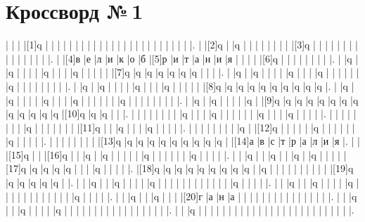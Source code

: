 \documentclass[final, pdftex, 12pt]{../../template/epsilonj}
\begin{document}
\section*{Кроссворд №\,1}
\PuzzleUnitlength=16pt
\begin{Puzzle}{28}{20}%
|{}  |{}  |{}  |[1]q   |{}  |{}  |{}  |{}  |{}  |{}  |{}  |{}  |{}  |{}  |{}  |{}  |{}  |{}  |{}  |{}  |{}  |{}  |{}  |{}  |{}  |{}  |{}  |{}  |.
|{}  |[2]q   |{}  |q   |{}  |{}  |{}  |{}  |{}  |{}  |{}  |{}  |[3]q   |{}  |{}  |{}  |{}  |{}  |{}  |{}  |{}  |{}  |{}  |{}  |{}  |{}  |{}  |{}  |.
|{}  |[4]{в} |{е} |{л} |{и} |{к} |{о} |{б} |[5]{р} |{и} |{т} |{а} |{н} |{и} |{я} |{}  |{}  |{}  |{}  |[6]q   |{}  |{}  |{}  |{}  |{}  |{}  |{}  |{}  |.
|{}  |q   |{}  |q   |{}  |{}  |{}  |{}  |q   |{}  |{}  |{}  |q   |{}  |{}  |{}  |{}  |{}  |[7]q   |q   |q   |q   |q   |q   |q   |{}  |{}  |{}  |.
|{}  |q   |{}  |q   |{}  |{}  |{}  |{}  |q   |{}  |{}  |{}  |q   |{}  |{}  |{}  |{}  |{}  |{}  |q   |{}  |{}  |{}  |{}  |{}  |{}  |{}  |{}  |.
|{}  |q   |{}  |q   |{}  |{}  |{}  |{}  |q   |{}  |{}  |{}  |q   |{}  |{}  |{}  |{}  |{}  |[8]q   |q   |q   |q   |q   |q   |q   |q   |q   |q   |.
|{}  |q   |{}  |q   |{}  |{}  |{}  |{}  |q   |{}  |{}  |{}  |q   |{}  |{}  |{}  |{}  |{}  |{}  |q   |{}  |{}  |{}  |{}  |{}  |{}  |{}  |{}  |.
|{}  |q   |{}  |q   |{}  |{}  |{}  |{}  |q   |{}  |[9]q   |q   |q   |q   |q   |q   |q   |q   |q   |q   |q   |q   |q   |[10]q   |q   |q   |{}  |{}  |.
|{}  |{}  |{}  |{}  |{}  |{}  |{}  |{}  |q   |{}  |{}  |{}  |q   |{}  |{}  |{}  |{}  |{}  |{}  |q   |{}  |{}  |{}  |q   |{}  |{}  |{}  |{}  |.
|{}  |{}  |{}  |{}  |{}  |{}  |{}  |{}  |q   |{}  |{}  |{}  |{}  |{}  |{}  |{}  |[11]q   |{}  |{}  |q   |{}  |{}  |{}  |q   |{}  |{}  |{}  |{}  |.
|{}  |{}  |{}  |{}  |{}  |{}  |{}  |{}  |q   |{}  |[12]q   |{}  |{}  |{}  |{}  |{}  |q   |{}  |{}  |{}  |{}  |{}  |{}  |q   |{}  |{}  |{}  |{}  |.
|{}  |{}  |{}  |{}  |{}  |{}  |{}  |{}  |[13]q   |q   |q   |q   |q   |q   |q   |q   |q   |q   |{}  |[14]{а} |{в} |{с} |{т} |{р} |{а} |{л} |{и} |{я} |.
|{}  |{}  |[15]q   |{}  |{}  |[16]q   |{}  |{}  |q   |{}  |q   |{}  |{}  |{}  |{}  |{}  |q   |{}  |{}  |{}  |{}  |{}  |{}  |q   |{}  |{}  |{}  |{}  |.
|{}  |{}  |q   |{}  |{}  |q   |{}  |{}  |q   |{}  |q   |{}  |{}  |{}  |{}  |[17]q   |q   |q   |q   |q   |{}  |{}  |{}  |q   |{}  |{}  |{}  |{}  |.
|[18]q   |q   |q   |q   |q   |q   |q   |q   |q   |{}  |q   |{}  |{}  |{}  |{}  |{}  |{}  |{}  |{}  |{}  |{}  |[19]q   |q   |q   |q   |q   |q   |{}  |.
|{}  |{}  |q   |{}  |{}  |q   |{}  |{}  |{}  |{}  |q   |{}  |{}  |{}  |{}  |{}  |{}  |{}  |{}  |{}  |{}  |{}  |{}  |q   |{}  |{}  |{}  |{}  |.
|{}  |{}  |q   |{}  |{}  |q   |{}  |{}  |{}  |{}  |q   |{}  |{}  |{}  |{}  |{}  |{}  |{}  |{}  |{}  |{}  |{}  |{}  |q   |{}  |{}  |{}  |{}  |.
|{}  |{}  |q   |{}  |{}  |q   |{}  |{}  |{}  |[20]{г} |{а} |{н} |{а} |{}  |{}  |{}  |{}  |{}  |{}  |{}  |{}  |{}  |{}  |{}  |{}  |{}  |{}  |{}  |.
|{}  |{}  |q   |{}  |{}  |q   |{}  |{}  |{}  |{}  |q   |{}  |{}  |{}  |{}  |{}  |{}  |{}  |{}  |{}  |{}  |{}  |{}  |{}  |{}  |{}  |{}  |{}  |.
|{}  |{}  |q   |{}  |{}  |{}  |{}  |{}  |{}  |{}  |{}  |{}  |{}  |{}  |{}  |{}  |{}  |{}  |{}  |{}  |{}  |{}  |{}  |{}  |{}  |{}  |{}  |{}  |.
\end{Puzzle}
\end{document}
